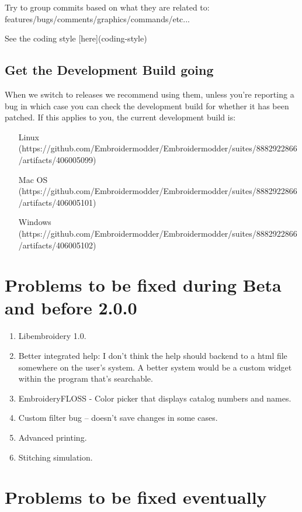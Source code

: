 \documentclass{report}
\begin{document}
Try to group commits based on what they are related to: features/bugs/comments/graphics/commands/etc...

See the coding style [here](coding-style)

\subsection{Get the Development Build going}

When we switch to releases we recommend using them, unless you're reporting a bug in which case you can check the development build for whether it has been patched. If this applies to you, the current development build is:

\begin{itemize}
\item [Linux](https://github.com/Embroidermodder/Embroidermodder/suites/8882922866/artifacts/406005099)
\item [Mac OS](https://github.com/Embroidermodder/Embroidermodder/suites/8882922866/artifacts/406005101)
\item [Windows](https://github.com/Embroidermodder/Embroidermodder/suites/8882922866/artifacts/406005102)
\end{itemize}

\section{Problems to be fixed during Beta and before 2.0.0}

\begin{enumerate}
\item Libembroidery 1.0.
\item Better integrated help: I don't think the help should backend to a html file somewhere on the user's system. A better system would be a custom widget within the program that's searchable.
\item EmbroideryFLOSS - Color picker that displays catalog numbers and names.
\item Custom filter bug -- doesn't save changes in some cases.
\item Advanced printing.
\item Stitching simulation.
\end{enumerate}

\section{Problems to be fixed eventually}
\end{document}
